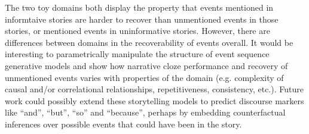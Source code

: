 \documentclass[10pt,a4paper]{article}
\begin{document}
The two toy domains both display the property that events mentioned in informtaive stories are harder to recover than unmentioned events in those stories, or mentioned events in uninformative stories. However, there are differences between domains in the recoverability of events overall. It would be interesting to parametrically manipulate the structure of event sequence generative models and show how narrative cloze performance and recovery of unmentioned events varies with properties of the domain (e.g. complexity of causal and/or correlational relationships, repetitiveness, consistency, etc.). Future work could possibly extend these storytelling models to predict discourse markers like ``and'', ``but'', ``so'' and ``because'', perhaps by embedding counterfactual inferences over possible events that could have been in the story.
\end{document}
